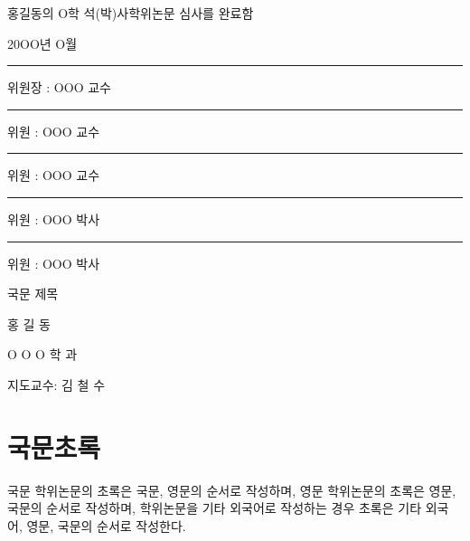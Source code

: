 \documentclass[11pt]{report}
\numberwithin{figure}{section}
\theoremstyle{plain}
\theoremstyle{definition}
\theoremstyle{corollary}
\theoremstyle{definition}
\theoremstyle{plain}
\theoremstyle{definition}
\theoremstyle{plain}
\begin{document}
\newpage %
\par\vspace{1cm}
\Large 홍길동의 O학 석(박)사학위논문 심사를 완료함
\par\vspace{2.5cm}
\Large 20OO년 O월
\par\vspace{2cm}
\rule{.6\textwidth}{0.4pt}\par %
\Large 위원장 : OOO 교수
\par\vspace{1cm}
\rule{.6\textwidth}{0.4pt}\par %
위원 : OOO 교수
\par\vspace{1cm}
\rule{.6\textwidth}{0.4pt}\par %
위원 : OOO 교수
\par\vspace{1cm}
\rule{.6\textwidth}{0.4pt}\par %
위원 : OOO 박사
\par\vspace{1cm}
\rule{.6\textwidth}{0.4pt}\par %
위원 : OOO 박사

\newpage
{}
\begin{center}
\LARGE 국문 제목
\par\vspace{20pt}
\normalsize 홍 길 동\par
O O O 학 과\par
지도교수: 김 철 수

\par\vspace{20pt}
\section*{국문초록}

\end{center}
\normalsize
국문 학위논문의 초록은 국문, 영문의 순서로 작성하며, 영문 학위논문의 초록은 영문, 국문의 순서로 작성하며, 학위논문을 기타 외국어로 작성하는 경우 초록은 기타 외국어, 영문, 국문의 순서로 작성한다.
\end{document}
